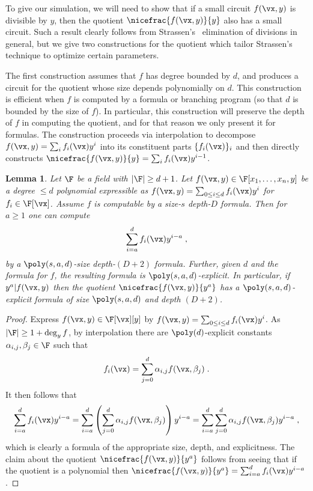 \documentclass[11pt]{article}
\numberwithin{equation}{section}
\newtheorem{lemma}[theorem]{Lemma}
\theoremstyle{definition}
\theoremstyle{plain}
\begin{document}
To give our simulation, we will need to show that if a small circuit $f(\vx,y)$ is divisible by $y$, then the quotient $\nicefrac{f(\vx,y)}{y}$ also has a small circuit. Such a result clearly follows from Strassen's~\cite{Strassen73} elimination of divisions in general, but we give two constructions for the quotient which tailor Strassen's~\cite{Strassen73} technique to optimize certain parameters.

The first construction assumes that $f$ has degree bounded by $d$, and produces a circuit for the quotient whose size depends polynomially on $d$.  This construction is efficient when $f$ is computed by a formula or branching program (so that $d$ is bounded by the size of $f$).  In particular, this construction will preserve the depth of $f$ in computing the quotient, and
for that reason we only present it for formulas.  The construction proceeds via interpolation to decompose $f(\vx,y)=\sum_i f_i(\vx)y^i$ into its constituent parts $\{f_i(\vx)\}_i$ and then directly constructs $\nicefrac{f(\vx,y)}{y}=\sum_i f_i(\vx)y^{i-1}$.%


\begin{lemma}\label{res:divide-by-y:black-box}
        Let $\F$ be a field with $|\F|\ge d+1$.  Let $f(\vx,y)\in\F[x_1,\ldots,x_n,y]$ be a degree $\le d$ polynomial expressible as $f(\vx,y)=\sum_{0\le i\le d} f_i(\vx)y^i$ for $f_i\in\F[\vx]$.  Assume $f$ is computable by a size-$s$ depth-$D$ formula. Then for $a\ge 1$ one can compute
        \[
                \sum_{i=a}^d f_i(\vx) y^{i-a}
                \;,
        \]
        by a $\poly(s,a,d)$-size depth-$(D+2)$ formula.  Further, given $d$ and the formula for $f$, the resulting formula is $\poly(s,a,d)$-explicit. In particular, if $y^a|f(\vx,y)$ then the quotient $\nicefrac{f(\vx,y)}{y^a}$ has a $\poly(s,a,d)$-explicit formula of size $\poly(s,a,d)$ and depth $(D+2)$.
\end{lemma}
\begin{proof}
        Express $f(\vx,y)\in\F[\vx][y]$ by $f(\vx,y)=\sum_{0\le i\le d} f_i(\vx)y^i$. As $|\F|\ge 1+\deg_y f$, by interpolation there are $\poly(d)$-explicit constants $\alpha_{i,j},\beta_j\in\F$ such that
        \[
                f_i(\vx)=\sum_{j=0}^d \alpha_{i,j}f(\vx,\beta_j)
                \;.
        \]
        It then follows that
        \[
                \sum_{i=a}^d f_i(\vx) y^{i-a}
                =\sum_{i=a}^d \left(\sum_{j=0}^d \alpha_{i,j}f(\vx,\beta_j)\right) y^{i-a}
                =\sum_{i=a}^d \sum_{j=0}^d \alpha_{i,j}f(\vx,\beta_j) y^{i-a}
                \;,
        \]
        which is clearly a formula of the appropriate size, depth, and explicitness. The claim about the quotient $\nicefrac{f(\vx,y)}{y^a}$ follows from seeing that if the quotient is a polynomial then $\nicefrac{f(\vx,y)}{y^a}=\sum_{i=a}^d f_i(\vx) y^{i-a}$.
\end{proof}
\end{document}
